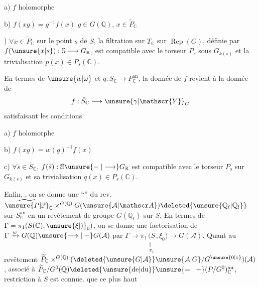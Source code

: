 a) $f$ holomorphe

b) $f(xg)=g^{-1}f(x)$ \qquad $g\in G(\mathbb{Q}),\,x\in\widetilde P_{\mathbb{C}}$

) $\forall x\in\widetilde P_{\mathbb{C}}$ sur le point $s$ de $S$, la  filtration sur $T_{\mathbb{C}}$ sur $\operatorname{Rep}(G)$, définie par $f(\unsure{x|s}):\mathbb{S}\longrightarrow G_{\mathbb{R}}$, est compatible
avec le torseur $P_s$ sous $G_{k(s)}$ et la trivialisation $p(x)\in P_s(\mathbb{C})$.

En termes de $\unsure{w|\omega}$ et $q:\bar S_{\mathbb{C}}\longrightarrow P_{\mathbb{C}}^{\mathrm{an}}$, la donnée de $f$ revient à la donnée de
\[
f:\bar S_{\mathbb{C}}\longrightarrow\unsure{\gamma|\mathscr{Y}}_G
\]
satisfaisant les conditions

a) $f$ holomorphe

b) $f(xg)=w(g)^{-1}f(x)$

c)  $\forall\bar s\in\bar S_{\mathbb{C}}$,  $f(\bar s):\mathbb{S}\unsure{\relbar|\longrightarrow}G_{\mathbb{R}}$ est compatible avec le torseur $P_s$ sur $G_{k(s)}$ et sa trivialisation $q(x)\in P_s(\mathbb{C})$.

Enfin, , on se donne une ``'' du rev. $\widetilde{\unsure{P|\mathbb P}}_{\mathbb{C}}\mathbin{\times}^{G(\mathbb{Q})}G(\unsure{\mathcal A|\mathscr A})\deleted{\unsure{\mathbb{Q}_{\ell}|\mathbb{Q}_l}}$ sur $S_{\mathbb{C}}^{\mathrm{an}}$ en un revêtement
 de groupe $G(\mathbb{Q}_{\ell})$ sur $S$, En termes  de $\Gamma=\pi_1(S(\mathbb{C}),\unsure{\xi|\mathord{)}}_0)$, on se donne une factorisation de $\Gamma\xrightarrow{w}G(\mathbb{Q})\unsure{\longrightarrow|\relbar}G(\mathcal A)$ par $\Gamma\longrightarrow\pi_1\underset{\substack{\Vert\\\pi_1}}{(S},\xi_0)\longrightarrow G(\mathcal A)$. Quant au revêtement $\widetilde P_{\mathbb{C}}\mathbin{\times}^{G(\mathbb{Q})}(\deleted{\unsure{G|\mathcal A}}\unsure{\mathcal A|G}/G^{\unsure{0|\circ}})(\mathcal A)$,  associé à $\widetilde P_{\mathbb{C}}/G^0(\mathbb{Q})\deleted{\unsure{\text{de}|\text{du}}}\unsure{=|\relbar}(P/G^0)_{\mathbb{C}}^{\mathrm{an}}$,      restriction à $S$  est connue.  que ce    plus haut

